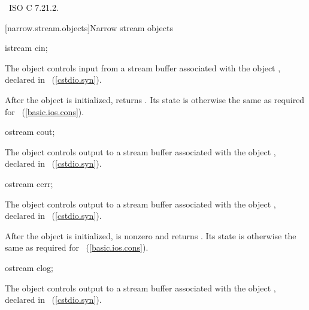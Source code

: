 \xref~ISO C 7.21.2.

[narrow.stream.objects]{Narrow stream objects}

%
\begin{itemdecl}
istream cin;
\end{itemdecl}

\begin{itemdescr}
\pnum
The object
controls input from a stream buffer
associated with the object
,
declared in
%
~(\ref{cstdio.syn}).

\pnum
After the object
is initialized,
returns
.
Its state is otherwise the same as required for
~(\ref{basic.ios.cons}).
\end{itemdescr}

%
\begin{itemdecl}
ostream cout;
\end{itemdecl}

\begin{itemdescr}
\pnum
The object
controls output to a stream buffer
associated with the object
,
declared in
%
~(\ref{cstdio.syn}).
\end{itemdescr}

%
\begin{itemdecl}
ostream cerr;
\end{itemdecl}

\begin{itemdescr}
\pnum
The object
controls output to a stream buffer
associated with the object
,
declared in
%
~(\ref{cstdio.syn}).

\pnum
After the object
is initialized,
is nonzero and  returns .
Its state is otherwise the same as required for
~(\ref{basic.ios.cons}).
\end{itemdescr}

%
\begin{itemdecl}
ostream clog;
\end{itemdecl}

\begin{itemdescr}
\pnum
The object
controls output to a stream buffer
associated with the object
,
declared in
%
~(\ref{cstdio.syn}).
\end{itemdescr}

